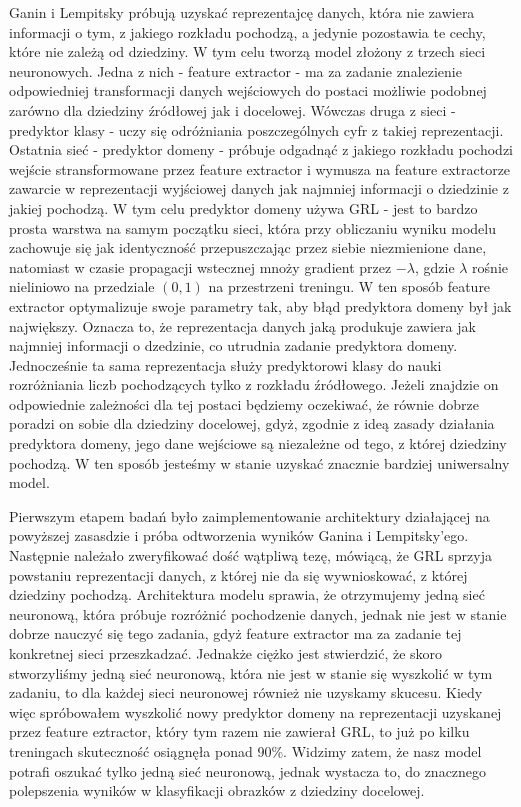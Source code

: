 \documentclass{article}
\begin{document}
Ganin i Lempitsky próbują uzyskać reprezentajcę danych, która nie zawiera informacji o tym, z jakiego rozkładu pochodzą, a jedynie pozostawia te cechy, które nie zależą od dziedziny. W tym celu tworzą model złożony z trzech sieci neuronowych. Jedna z nich - feature extractor - ma za zadanie znalezienie odpowiedniej transformacji danych wejściowych do postaci możliwie podobnej zarówno dla dziedziny źródłowej jak i docelowej. Wówczas druga z sieci - predyktor klasy - uczy się odróżniania poszczególnych cyfr z takiej reprezentacji. Ostatnia sieć - predyktor domeny - próbuje odgadnąć z jakiego rozkładu pochodzi wejście stransformowane przez feature extractor i wymusza na feature extractorze zawarcie w reprezentacji wyjściowej danych jak najmniej informacji o dziedzinie z jakiej pochodzą. W tym celu predyktor domeny używa GRL - jest to bardzo prosta warstwa na samym początku sieci, która przy obliczaniu wyniku modelu zachowuje się jak identyczność przepuszczając przez siebie niezmienione dane, natomiast w czasie propagacji wstecznej mnoży gradient przez $-\lambda$, gdzie $\lambda$ rośnie nieliniowo na przedziale $(0,1)$ na przestrzeni treningu. W ten sposób feature extractor optymalizuje swoje parametry tak, aby błąd predyktora domeny był jak największy. Oznacza to, że reprezentacja danych jaką produkuje zawiera jak najmniej informacji o dzedzinie, co utrudnia zadanie predyktora domeny. Jednocześnie ta sama reprezentacja służy predyktorowi klasy do nauki rozróżniania liczb pochodzących tylko z rozkładu źródłowego. Jeżeli znajdzie on odpowiednie zależności dla tej postaci będziemy oczekiwać, że równie dobrze poradzi on sobie dla dziedziny docelowej, gdyż, zgodnie z ideą zasady działania predyktora domeny, jego dane wejściowe są niezależne od tego, z której dziedziny pochodzą. W ten sposób jesteśmy w stanie uzyskać znacznie bardziej uniwersalny model.
\par
Pierwszym etapem badań było zaimplementowanie architektury działającej na powyższej zasasdzie i próba odtworzenia wyników Ganina i Lempitsky'ego. Następnie należało zweryfikować dość wątpliwą tezę, mówiącą, że GRL sprzyja powstaniu reprezentacji danych, z której nie da się wywnioskować, z której dziedziny pochodzą. Architektura modelu sprawia, że otrzymujemy jedną sieć neuronową, która próbuje rozróżnić pochodzenie danych, jednak nie jest w stanie dobrze nauczyć się tego zadania, gdyż feature extractor ma za zadanie tej konkretnej sieci przeszkadzać. Jednakże ciężko jest stwierdzić, że skoro stworzyliśmy jedną sieć neuronową, która nie jest w stanie się wyszkolić w tym zadaniu, to dla każdej sieci neuronowej również nie uzyskamy skucesu. Kiedy więc spróbowałem wyszkolić nowy predyktor domeny na reprezentacji uzyskanej przez feature eztractor, który tym razem nie zawierał GRL, to już po kilku treningach skuteczność osiągnęła ponad 90\%. Widzimy zatem, że nasz model potrafi oszukać tylko jedną sieć neuronową, jednak wystacza to, do znacznego polepszenia wyników w klasyfikacji obrazków z dziedziny docelowej.
\end{document}
